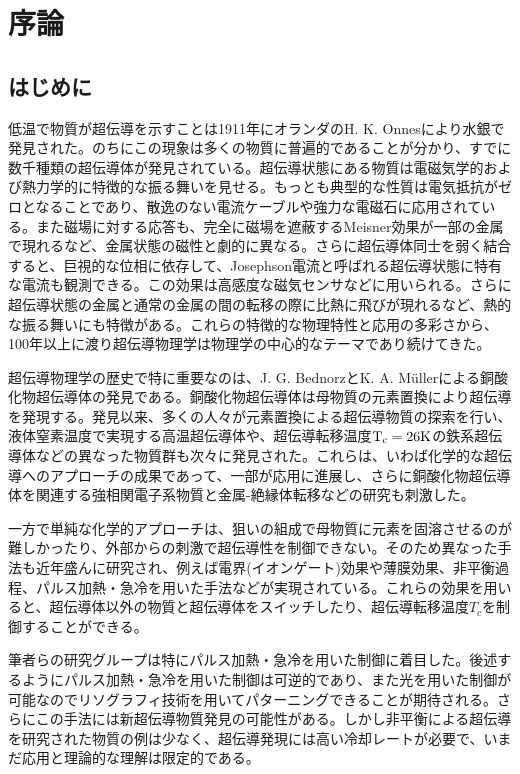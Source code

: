 \section{序論}
\subsection{はじめに}
低温で物質が超伝導を示すことは1911年にオランダのH. K. Onnesにより水銀で発見された。のちにこの現象は多くの物質に普遍的であることが分かり、すでに数千種類の超伝導体が発見されている。超伝導状態にある物質は電磁気学的および熱力学的に特徴的な振る舞いを見せる。もっとも典型的な性質は電気抵抗がゼロとなることであり、散逸のない電流ケーブルや強力な電磁石に応用されている。また磁場に対する応答も、完全に磁場を遮蔽するMeisner効果が一部の金属で現れるなど、金属状態の磁性と劇的に異なる。さらに超伝導体同士を弱く結合すると、巨視的な位相に依存して、Josephson電流と呼ばれる超伝導状態に特有な電流も観測できる。この効果は高感度な磁気センサなどに用いられる。さらに超伝導状態の金属と通常の金属の間の転移の際に比熱に飛びが現れるなど、熱的な振る舞いにも特徴がある。これらの特徴的な物理特性と応用の多彩さから、100年以上に渡り超伝導物理学は物理学の中心的なテーマであり続けてきた。

超伝導物理学の歴史で特に重要なのは、J. G. BednorzとK. A. M\"ullerによる銅酸化物超伝導体の発見である\cite{Bednorz}。銅酸化物超伝導体は母物質の元素置換により超伝導を発現する\cite{Lee2006}。発見以来、多くの人々が元素置換による超伝導物質の探索を行い、液体窒素温度で実現する高温超伝導体\cite{Wu}や、超伝導転移温度$\rm T_c=26K$の鉄系超伝導体\cite{Kamihara}などの異なった物質群も次々に発見された。これらは、いわば化学的な超伝導へのアプローチの成果であって、一部が応用に進展し、さらに銅酸化物超伝導体を関連する強相関電子系物質と金属-絶縁体転移などの研究も刺激した\cite{Lee2006,Imada}。

一方で単純な化学的アプローチは、狙いの組成で母物質に元素を固溶させるのが難しかったり、外部からの刺激で超伝導性を制御できない。そのため異なった手法も近年盛んに研究され、例えば電界(イオンゲート)効果\cite{Ueno,Ueno2,Ye2009}や薄膜効果\cite{Chiang1900}、非平衡過程\cite{Fausti,Hunt2015,Mitrano2016}、パルス加熱・急冷\cite{oike}を用いた手法などが実現されている。これらの効果を用いると、超伝導体以外の物質と超伝導体をスイッチしたり、超伝導転移温度$T_c$を制御することができる。

筆者らの研究グループは特にパルス加熱・急冷を用いた制御に着目した。後述するようにパルス加熱・急冷を用いた制御は可逆的であり、また光を用いた制御が可能なのでリソグラフィ技術を用いてパターニングできることが期待される。さらにこの手法には新超伝導物質発見の可能性がある。しかし非平衡による超伝導を研究された物質の例は少なく、超伝導発現には高い冷却レートが必要で、いまだ応用と理論的な理解は限定的である。

